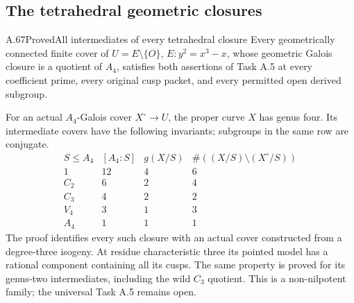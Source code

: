\subsection{The tetrahedral geometric closures}

\begin{statement}{A.67}{Proved}{All intermediates of every tetrahedral closure}
Every geometrically connected finite cover of
\(U=E\setminus\{O\}\), \(E:y^2=x^3-x\), whose geometric Galois
closure is a quotient of \(A_4\), satisfies both assertions of
Task A.5 at every coefficient prime, every original cusp packet,
and every permitted open derived subgroup.

For an actual \(A_4\)-Galois cover \(X^\circ\to U\), the proper
curve \(X\) has genus four. Its intermediate covers have the
following invariants; subgroups in the same row are conjugate.
\[
\begin{array}{c|r|r|r}
 S\le A_4&[A_4:S]&g(X/S)&\#((X/S)\setminus(X^\circ/S))\\ \hline
 1&12&4&6\\
 C_2&6&2&4\\
 C_3&4&2&2\\
 V_4&3&1&3\\
 A_4&1&1&1
\end{array}
\]
The proof identifies every such closure with an actual cover
constructed from a degree-three isogeny. At residue characteristic
three its pointed model has a rational component containing all
its cusps. The same property is proved for its genus-two
intermediates, including the wild \(C_3\) quotient. This is a
non-nilpotent family; the universal Task A.5 remains open.
\end{statement}

